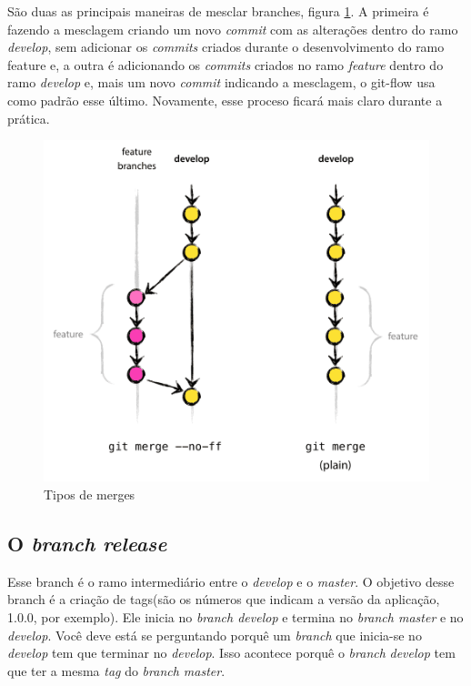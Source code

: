 \documentclass[12pt,openright,oneside,a4paper,english,brazil]{abntex2}
\begin{document}
São duas as principais maneiras de mesclar branches, figura \ref{feature-merges}. A primeira é fazendo a mesclagem criando um novo \textit{commit} com as alterações dentro do ramo \textit{develop}, sem adicionar os \textit{commits} criados durante o desenvolvimento do ramo feature e, a outra é adicionando os \textit{commits} criados no ramo \textit{feature} dentro do ramo \textit{develop} e, mais um novo \textit{commit} indicando a mesclagem, o git-flow usa como padrão esse último. Novamente, esse proceso ficará mais claro durante a prática.


\begin{figure}[h]
	\caption{\label{feature-merges}Tipos de merges}
	\begin{center}
		\includegraphics[width=0.8\linewidth]{feature-merges}
	\end{center}
\end{figure}

\subsection{O \textit{branch release}}

Esse branch é o ramo intermediário entre o \textit{develop} e o \textit{master}. O objetivo desse branch é a criação de tags(são os números que indicam a versão da aplicação, 1.0.0, por exemplo). Ele inicia no \textit{branch develop} e termina no \textit{branch master} e no \textit{develop}. Você deve está se perguntando porquê um \textit{branch} que inicia-se no \textit{develop} tem que terminar no \textit{develop}. Isso acontece porquê o \textit{branch} \textit{develop} tem que ter a mesma \textit{tag} do \textit{branch master}.
\end{document}
